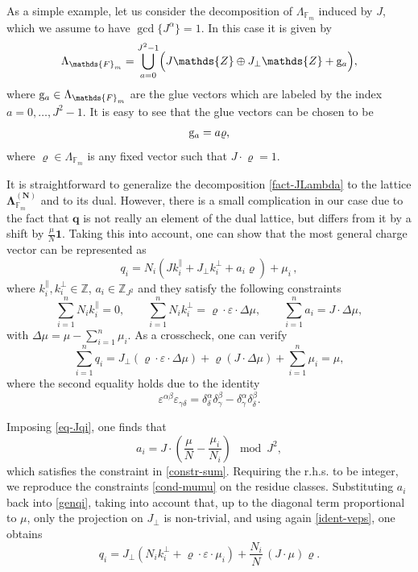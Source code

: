 \documentclass[12pt,letterpaper]{JHEP3}
\def\be{\begin{equation}}
\def\ee{\end{equation}}
\def\({\left(}
\def\){\right)}
\def\vrh{\varrho}
\newcommand{\veps}{\varepsilon}
\newcommand{\IZ}{\mathds{Z}}
\newcommand{\IF}{\mathds{F}}
\newcommand{\bfq}{{\boldsymbol q}}
\newcommand{\bfN}{{\boldsymbol N}}
\newcommand{\bfLam}{{\boldsymbol \Lambda}}
\def\glu{{\rm g}}
\begin{document}
As a simple example, let us consider the decomposition of $\Lambda_{\IF_m}$ induced by $J$,
which we assume to have $\gcd\{J^\alpha\}=1$. In this case it is given by
\be 
\Lambda_{\IF_m}=\bigcup_{a=0}^{J^2-1}\Bigl(J\IZ\oplus J_\perp\IZ+\glu_a\Bigr),
\label{fact-JLambda}
\ee 
where $\glu_a\in\Lambda_{\IF_m}$ are the glue vectors which are labeled by the index $a=0,\dots, J^2-1$.
It is easy to see that the glue vectors can be chosen to be
\be 
\glu_a=a\vrh, 
\ee
where $\vrh\in\Lambda_{\IF_m}$ is any fixed vector such that $J\cdot \vrh=1$.

It is straightforward to generalize the decomposition \eqref{fact-JLambda} to the lattice $\bfLam^{(\bfN)}_{\IF_m}$
and to its dual. However, there is a small complication in our case due to the fact that $\bfq$ is not really an element
of the dual lattice, but differs from it by a shift by $\frac{\mu}{N} \boldsymbol{1}$.
Taking this into account, one can show that the most general charge vector can be represented as 
\be 
q_i=N_i\(J k^\parallel_i+J_\perp k^\perp_i +a_i\vrh\)+\mu_i\, ,
\label{genqi}
\ee 
where $k^\parallel_i,k^\perp_i \in\IZ$, $a_i\in\IZ_{J^2}$ and they satisfy the following constraints
\be
\sum_{i=1}^n  N_i k^\parallel_i =0 ,
\qquad 
\sum_{i=1}^n  N_i k^\perp_i =\vrh\cdot\veps\cdot\Delta\mu,
\qquad
\sum_{i=1}^n  a_i=J\cdot \Delta\mu,
\label{constr-sum}
\ee 
with $\Delta\mu=\mu-\sum_{i=1}^n\mu_i$.
As a crosscheck, one can verify 
\be 
\sum_{i=1}^nq_i=J_\perp(\vrh\cdot\veps\cdot\Delta\mu)+\vrh(J\cdot \Delta\mu)+\sum_{i=1}^n\mu_i=\mu,
\ee
where the second equality holds due to the identity
\be
\veps^{\alpha\beta}\veps_{\gamma\delta}=\delta^\alpha_\delta\delta^\beta_\gamma-\delta^\alpha_\gamma\delta^\beta_\delta.
\label{ident-veps}
\ee

Imposing \eqref{eq-Jqi}, one finds that
\be
a_i=J\cdot \(\frac{\mu}{N}-\frac{\mu_i}{N_i}\) \mod J^2,
\ee 
which satisfies the constraint in \eqref{constr-sum}.
Requiring the r.h.s. to be integer, we reproduce the constraints \eqref{cond-mumu} on the residue classes.
Substituting $a_i$ back into \eqref{genqi}, taking into account that, up to the diagonal term proportional to $\mu$, 
only the projection on $J_\perp$ is non-trivial, and using again \eqref{ident-veps}, one obtains
\be 
q_i=J_\perp\(N_ik^\perp_i+\vrh\cdot\veps\cdot\mu_i\)+\frac{N_i}{N}\, (J\cdot\mu)\vrh.
\label{sol-G0}
\ee 
\end{document}
